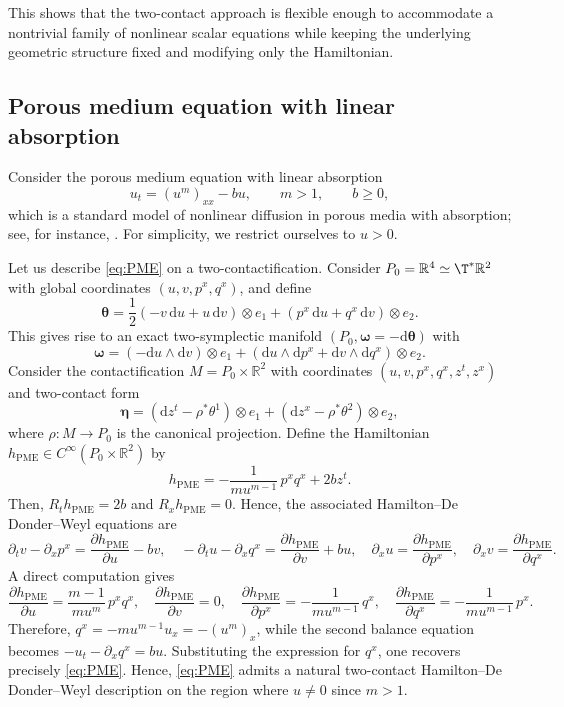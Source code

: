 \documentclass[11pt,a4paper]{article}
\newcommand{\dd}{\mathrm{d}}
\theoremstyle{plain} \newtheorem{theorem}{Theorem}[section] \newtheorem{proposition}[theorem]{Proposition} \newtheorem{corollary}[theorem]{Corollary} \newtheorem{lemma}[theorem]{Lemma} \theoremstyle{definition} \newtheorem{definition}[theorem]{Definition} \theoremstyle{remark} \newtheorem{remark}[theorem]{Remark} \newtheorem{example}[theorem]{Example} %
\begin{document}
This shows that the two-contact approach is flexible enough to accommodate a nontrivial family of nonlinear scalar equations while keeping the underlying geometric structure fixed and modifying only the Hamiltonian.
 
\subsection{Porous medium equation with linear absorption}
\label{subsec:PME}

Consider the porous medium equation with linear absorption
\begin{equation}\label{eq:PME}
u_t=(u^m)_{xx}-bu,\qquad m>1,\qquad b\geq 0,
\end{equation}
which is a standard model of nonlinear diffusion in porous media with absorption; see, for instance, \cite{Barenblatt1952,Aronson1986,Vazquez2007,BandleNanbuStakgold1998,Kwak1998}. For simplicity, we restrict ourselves to $u>0$.

Let us describe \eqref{eq:PME} on a two-contactification. Consider \(P_0=\mathbb R^4\simeq \T^*\mathbb{R}^2\) with global coordinates \((u,v,p^x,q^x)\), and define
\[
\bm\theta=\frac12(-v\,\dd u+u\,\dd v)\otimes e_1+(p^x\,\dd u+q^x\,\dd v)\otimes e_2.
\]
This gives rise to an exact two-symplectic manifold \((P_0,\bm\omega=-\dd\bm\theta)\) with
\[
\bm\omega=(-\dd u\wedge\dd v)\otimes e_1+(\dd u\wedge\dd p^x+\dd v\wedge\dd q^x)\otimes e_2.
\]
Consider the contactification \(M=P_0\times\mathbb R^2\) with coordinates \((u,v,p^x,q^x,z^t,z^x)\) and two-contact form
\[
\bm\eta=(\dd z^t-\rho^*\theta^1)\otimes e_1+(\dd z^x-\rho^*\theta^2)\otimes e_2,
\]
where \(\rho:M\to P_0\) is the canonical projection. Define the Hamiltonian \(h_{\mathrm{PME}}\in C^\infty(P_0\times\mathbb R^2)\) by
\[
h_{\mathrm{PME}}=-\frac{1}{m u^{m-1}}\,p^x q^x+2b z^t.
\]
Then, \(R_th_{\mathrm{PME}}=2b\) and \(R_xh_{\mathrm{PME}}=0\). Hence, the associated Hamilton--De Donder--Weyl equations are
\[
\partial_t v-\partial_x p^x=\frac{\partial h_{\mathrm{PME}}}{\partial u}- b   v,\quad
-\partial_t u-\partial_x q^x=\frac{\partial h_{\mathrm{PME}}}{\partial v}+ b  u,\quad
\partial_x u=\frac{\partial h_{\mathrm{PME}}}{\partial p^x},\quad
\partial_x v=\frac{\partial h_{\mathrm{PME}}}{\partial q^x}.
\]
A direct computation gives
\[
\frac{\partial h_{\mathrm{PME}}}{\partial u}=\frac{m-1}{m u^m}\,p^x q^x,\quad
\frac{\partial h_{\mathrm{PME}}}{\partial v}=0,\quad
\frac{\partial h_{\mathrm{PME}}}{\partial p^x}=-\frac{1}{m u^{m-1}}\,q^x,\quad
\frac{\partial h_{\mathrm{PME}}}{\partial q^x}=-\frac{1}{m u^{m-1}}\,p^x.
\]
Therefore, \(q^x=-m u^{m-1}u_x=-(u^m)_x\), while the second balance equation becomes \(-u_t-\partial_x q^x=b u\). Substituting the expression for \(q^x\), one recovers precisely \eqref{eq:PME}. Hence, \eqref{eq:PME} admits a natural two-contact Hamilton--De Donder--Weyl description on the region where \(u\neq0\) since $m>1$.
\end{document}
